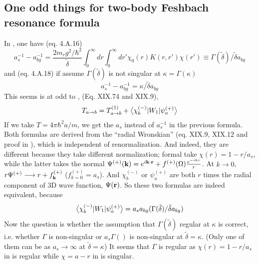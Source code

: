 \subsection{One odd things for two-body Feshbach resonance formula\label{sec:LeggettAndMessiah}}
In \cite{Leggett},  one have (eq. 4.A.16)
\begin{equation}\label{eq:20100920:leggett}
a^{-1}_{s}-a^{-1}_{bg}=\frac{2m_{r}g^{2}/\hbar^{2}}{\tilde\delta}\int^{\infty}_{0}dr\int_{0}^{\infty}{dr'}\chi_{0}(r)K(r,r')\chi(r')\equiv{}\Gamma(\tilde\delta)/\tilde{\delta}a_{bg}
\end{equation}
and (eq. 4.A.18) if assume $\Gamma(\tilde\delta)$ is not singular at $\kappa=\Gamma(\kappa)$
\begin{equation}\label{eq:20100920:messiah}
a^{-1}_{s}-a^{-1}_{bg}=\kappa/\tilde{\delta}a_{bg}
\end{equation}
 This seems is at odd to \cite{Messiah}, (Eq. XIX.74 and XIX.9),
\begin{equation}
T_{a\rightarrow{b}}=T^{(1)}_{a\rightarrow{b}}+\bigl<{\chi_{b}^{(-)}{\lvert{W_{1}}\rvert}\psi_{a}^{(+)}}\bigr>
\end{equation}
If we take $T=4\pi\hbar^{2}a/m$, we get the $a_{s}$ instead of $a_{s}^{-1}$ in the previous formula.  
Both formulas are derived from the ``radial Wronskian'' (eq. XIX.9, XIX.12 and proof in \cite{Messiah}), which is independent of renormalization.  And indeed, they are different because they take different normalization;  formal take $\chi(r)=1-r/a_{s}$, while the latter takes the normal $\Psi^{(+)}(\mathbf{k})=e^{i\mathbf{k}\cdot\mathbf{r}}+f^{(+)}(\Omega)\frac{e^{-ikr}}{r}$.  At $k\longrightarrow0$, $r\Psi^{(+)}\longrightarrow{r+f^{(+)}_{\ensuremath{\mathbf{k}}}}$ ($f^{(+)}_{k=0}=a_s$). And $\chi_b^{(-)}$ or $\psi_a^{(+)}$ are both $r$ times the radial component of 3D wave function, $\Psi(\mathbf{r})$.  So these two formulas are indeed equivalent, because 
\[
\bigl<{\chi_{b}^{(-)}{\lvert{W_{1}}\rvert}\psi_{a}^{(+)}}\bigr>=a_{s}a_{bg}(\Gamma(\tilde\delta)/\tilde{\delta}a_{bg})
\]
Now the question is whether the assumption that $\Gamma(\tilde\delta)$ regular at $\kappa$ is correct, i.e. whether $\Gamma$ is non-singular or $a_{s}\Gamma()$ is non-singular at $\tilde\delta=\kappa$. (Only one of them can be as $a_{s}\rightarrow\infty$ at $\tilde\delta=\kappa$)  It seems that $\Gamma$ is regular as $\chi(r)=1-r/a_{s}$ in  is regular while $\chi=a-r$ in  is singular.  